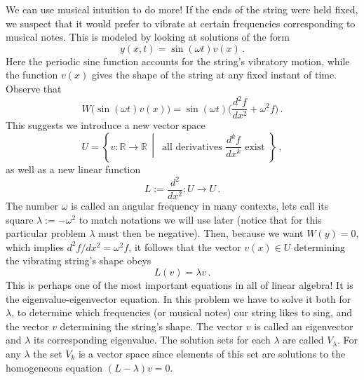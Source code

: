\begin{example}
We can use musical intuition to do more! If the ends of the string were held fixed, we suspect that it would prefer to vibrate at certain frequencies corresponding to musical notes.
This is modeled by looking at solutions of the form
\[
y(x,t)=\sin(\omega t) v(x)\, .
\]
Here the periodic sine function accounts for the string's vibratory motion, while the function $v(x)$ gives the shape of the string at any fixed instant of time. Observe that
\[
W\big(\sin(\omega t) v(x)\big)=\sin(\omega t)\big(\frac{d^2f}{dx^2}+\omega^2 f\big)\, .
\]
This suggests we introduce a new vector space \[U=\left\{v:{\mathbb R}\to {\mathbb R}\, \middle| \, \text{ all derivatives } \frac{d^kf}{d x^k }\text{~exist~} \right\}\, ,
\]
as well as a new linear function
\[
L:=\frac{d^2}{dx^2}: U\longrightarrow U\, .
\]
The number $\omega$ is called an angular frequency in many contexts, lets call its square $\lambda:=-\omega^2$ to match notations we will use later (notice that for this particular problem $\lambda$ must then  be negative).
Then, because we want $W(y)=0$, which implies $d^2 f/dx^2=\omega^2 f$, it follows that the vector $v(x)\in U$ determining the vibrating string's shape obeys
\[
L(v)=\lambda v\, .
\]
This is perhaps one of the most important equations in all of linear algebra! It is the eigenvalue-eigenvector equation. In this problem we have to solve it both for $\lambda$, to determine which frequencies (or musical notes) our string likes to sing, and the vector $v$ determining the string's shape. The vector $v$ is called an eigenvector and $\lambda$ its corresponding eigenvalue.
The solution sets for each $\lambda$ are called $V_\lambda$. For any $\lambda$ the set $V_k$ is a vector space since elements of this set are solutions to the homogeneous equation $(L-\lambda)v=0.$ 



\end{example}

